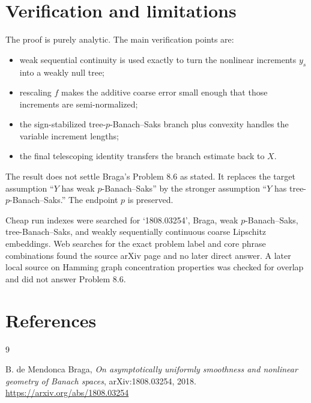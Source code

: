 \documentclass[11pt]{amsart}
\begin{document}
\section{Verification and limitations}

The proof is purely analytic.  The main verification points are:
\begin{itemize}
  \item weak sequential continuity is used exactly to turn the nonlinear increments \(y_s\) into a weakly null tree;
  \item rescaling \(f\) makes the additive coarse error small enough that those increments are semi-normalized;
  \item the sign-stabilized tree-\(p\)-Banach--Saks branch plus convexity handles the variable increment lengths;
  \item the final telescoping identity transfers the branch estimate back to \(X\).
\end{itemize}

The result does not settle Braga's Problem 8.6 as stated.  It replaces the target assumption ``\(Y\) has weak \(p\)-Banach--Saks'' by the stronger assumption ``\(Y\) has tree-\(p\)-Banach--Saks.''  The endpoint \(p\) is preserved.

Cheap run indexes were searched for `1808.03254', Braga, weak \(p\)-Banach--Saks, tree-Banach--Saks, and weakly sequentially continuous coarse Lipschitz embeddings.  Web searches for the exact problem label and core phrase combinations found the source arXiv page and no later direct answer.  A later local source on Hamming graph concentration properties was checked for overlap and did not answer Problem 8.6.

\section{References}

\begin{thebibliography}{9}

B. de Mendonca Braga,
\emph{On asymptotically uniformly smoothness and nonlinear geometry of Banach spaces},
arXiv:1808.03254, 2018.
\url{https://arxiv.org/abs/1808.03254}

\end{thebibliography}
\end{document}
